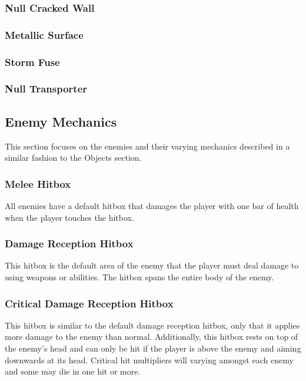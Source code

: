 \documentclass[12pt]{article}
\begin{document}
\subsubsection{Null Cracked Wall}

\subsubsection{Metallic Surface}

\subsubsection{Storm Fuse}

\subsubsection{Null Transporter}

\subsection{Enemy Mechanics}

This section focuses on the enemies and their varying mechanics described in a similar fashion to the Objects section. 

\subsubsection{Melee Hitbox}

All enemies have a default hitbox that damages the player with one bar of health when the player touches the hitbox. 

\subsubsection{Damage Reception Hitbox}

This hitbox is the default area of the enemy that the player must deal damage to using weapons or abilities. The hitbox spans the entire body of the enemy.

\subsubsection{Critical Damage Reception Hitbox}

This hitbox is similar to the default damage reception hitbox, only that it applies more damage to the enemy than normal. Additionally, this hitbox rests on top of the enemy's head and can only be hit if the player is above the enemy and aiming downwards at its head. Critical hit multipliers will varying amongst each enemy and some may die in one hit or more. 
\end{document}
